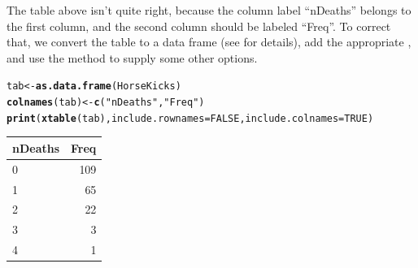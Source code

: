 \documentclass[11pt]{book}\usepackage[]{graphicx}\usepackage[]{color}
\makeatletter
\newcommand{\hlnum}[1]{\textcolor[rgb]{0.686,0.059,0.569}{#1}}%
\newcommand{\hlstr}[1]{\textcolor[rgb]{0.192,0.494,0.8}{#1}}%
\newcommand{\hlstd}[1]{\textcolor[rgb]{0.345,0.345,0.345}{#1}}%
\newcommand{\hlkwb}[1]{\textcolor[rgb]{0.69,0.353,0.396}{#1}}%
\newcommand{\hlkwc}[1]{\textcolor[rgb]{0.333,0.667,0.333}{#1}}%
\newcommand{\hlkwd}[1]{\textcolor[rgb]{0.737,0.353,0.396}{\textbf{#1}}}%
\newenvironment{kframe}{%
 \def\at@end@of@kframe{}%
 \ifinner\ifhmode%
  \def\at@end@of@kframe{\end{minipage}}%
  \begin{minipage}{\columnwidth}%
 \fi\fi%
 \def\FrameCommand##1{\hskip\@totalleftmargin \hskip-\fboxsep
 \colorbox{shadecolor}{##1}\hskip-\fboxsep
     \hskip-\linewidth \hskip-\@totalleftmargin \hskip\columnwidth}%
 \MakeFramed {\advance\hsize-\width
   \@totalleftmargin\z@ \linewidth\hsize
   \@setminipage}}%
 {\par\unskip\endMakeFramed%
 \at@end@of@kframe}
\makeatother
\begin{document}
The table above isn't quite right, because the column label ``nDeaths''
belongs to the first column, and the second column should be labeled ``Freq''.
To correct that, we convert the  table to a data frame
(see  for details), add the appropriate ,
and use the  method to supply some other options.
\begin{kframe}
\begin{alltt}
\hlstd{tab} \hlkwb{<-} \hlkwd{as.data.frame}\hlstd{(HorseKicks)}
\hlkwd{colnames}\hlstd{(tab)} \hlkwb{<-} \hlkwd{c}\hlstd{(}\hlstr{"nDeaths"}\hlstd{,} \hlstr{"Freq"}\hlstd{)}
\hlkwd{print}\hlstd{(}\hlkwd{xtable}\hlstd{(tab),} \hlkwc{include.rownames}\hlstd{=}\hlnum{FALSE}\hlstd{,} \hlkwc{include.colnames}\hlstd{=}\hlnum{TRUE}\hlstd{)}
\end{alltt}
\end{kframe}%
\begin{table}[ht]
\centering
\begin{tabular}{lr}
  \hline
nDeaths & Freq \\ 
  \hline
0 & 109 \\ 
  1 &  65 \\ 
  2 &  22 \\ 
  3 &   3 \\ 
  4 &   1 \\ 
   \hline
\end{tabular}
\end{table}
\end{document}
